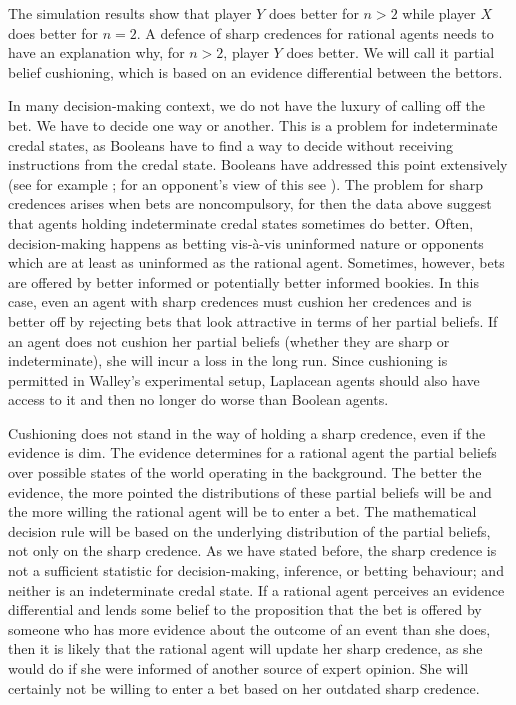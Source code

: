 The simulation results show that player $Y$ does better
for $n>2$ while player $X$ does better for $n=2$. A
defence of sharp credences for rational agents needs to
have an explanation why, for $n>2$, player $Y$ does
better. We will call it partial belief cushioning,
which is based on an evidence differential between the
bettors.

In many decision-making context, we do not have the
luxury of calling off the bet. We have to decide one
way or another. This is a problem for indeterminate
credal states, as Booleans have to find a way to decide
without receiving instructions from the credal state.
Booleans have addressed this point extensively (see for
example ; for an opponent's
view of this see ). The problem
for sharp credences arises when bets are noncompulsory,
for then the data above suggest that agents holding
indeterminate credal states sometimes do better. Often,
decision-making happens as betting vis-{\`a}-vis
uninformed nature or opponents which are at least as
uninformed as the rational agent. Sometimes, however,
bets are offered by better informed or potentially
better informed bookies. In this case, even an agent
with sharp credences must cushion her credences and is
better off by rejecting bets that look attractive in
terms of her partial beliefs. If an agent does not
cushion her partial beliefs (whether they are sharp or
indeterminate), she will incur a loss in the long run.
Since cushioning is permitted in Walley's experimental
setup, Laplacean agents should also have access to it
and then no longer do worse than Boolean agents.

Cushioning does not stand in the way of holding a sharp
credence, even if the evidence is dim. The evidence
determines for a rational agent the partial beliefs
over possible states of the world operating in the
background. The better the evidence, the more pointed
the distributions of these partial beliefs will be and
the more willing the rational agent will be to enter a
bet. The mathematical decision rule will be based on
the underlying distribution of the partial beliefs, not
only on the sharp credence. As we have stated before,
the sharp credence is not a sufficient statistic for
decision-making, inference, or betting behaviour; and
neither is an indeterminate credal state. If a rational
agent perceives an evidence differential and lends some
belief to the proposition that the bet is offered by
someone who has more evidence about the outcome of an
event than she does, then it is likely that the
rational agent will update her sharp credence, as she
would do if she were informed of another source of
expert opinion. She will certainly not be willing to
enter a bet based on her outdated sharp credence.

